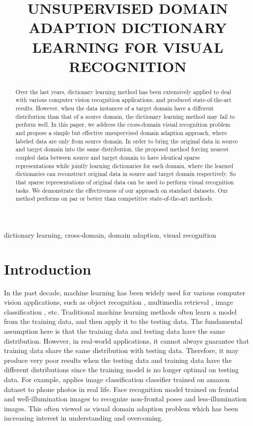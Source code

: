 \documentclass{article}
\title{UNSUPERVISED DOMAIN ADAPTION DICTIONARY LEARNING FOR VISUAL RECOGNITION}
\begin{document}
\maketitle


\begin{abstract}


Over the last years, dictionary learning method has been extensively applied to deal with various computer vision recognition applications, and produced state-of-the-art results. However, when the data instances of a target domain have a different distribution than that of a source domain, the dictionary learning method may fail to perform well. In this paper, we address the cross-domain visual recognition problem and propose a simple but effective unsupervised domain adaption approach, where labeled data are only from source domain.  In order to bring the original data in source and target domain into the same distribution, the proposed method forcing nearest coupled data  between source and target domain to have identical sparse representations while jointly learning dictionaries for each domain, where the learned dictionaries can reconstruct original data in source and target domain respectively. So that sparse representations of original data can be used to perform visual recognition tasks. We demonstrate the effectiveness of our approach on standard datasets. Our method performs on par or better than competitive state-of-the-art methods.

\end{abstract}
\begin{keywords}
dictionary learning, cross-domain, domain adaption, visual recognition
\end{keywords}
\section{Introduction}
\label{sec:intro}


In the past decade, machine learning has been widely used for various computer vision applications, such as object recognition \cite{zhang2011sparse}, multimedia retrieval  \cite{zheng2015fast,zheng2014coupled,kuang2015retrieval}, image classification \cite{sanchez2013image}, etc. Traditional machine learning methods often learn a model from the training data, and then apply it to the testing data. The fundamental assumption here is that the training data and testing data have the same distribution. However, in real-world applications, it cannot always guarantee that training data share the same distribution with testing data. Therefore, it may produce very poor results when the testing data and training data have the different distributions since the training model is no longer optimal on testing data. For example, applies image classification classifier trained on amazon dataset to phone photos in real life. Face recognition model trained on frontal and well-illumination images to recognize non-frontal poses and less-illumination images. This often viewed as visual domain adaption problem which has been increasing interest in understanding and overcoming.
\end{document}
